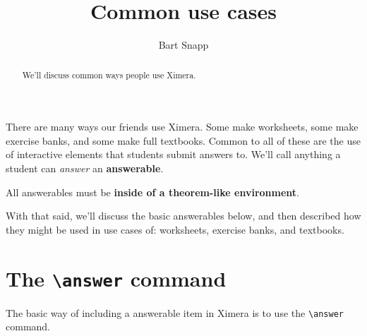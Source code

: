 \documentclass{ximera}
\title{Common use cases}
\author{Bart Snapp}
\begin{document}
\begin{abstract}
  We'll discuss common ways people use Ximera.
\end{abstract}
\maketitle

There are many ways our friends use Ximera. Some make worksheets, some make
exercise banks, and some make full textbooks. Common to all of these are the
use of interactive elements that students submit answers to. We'll call
anything a student can \textit{answer} an \textbf{answerable}.

\begin{warning}
  All answerables must be \textbf{inside of a theorem-like environment}.
\end{warning}

With that said, we'll discuss the basic answerables below, and then described
how they might be used in use cases of: worksheets, exercise banks, and
textbooks.

\section{The \texttt{\textbackslash answer} command}

The basic way of including a answerable item in Ximera is to use the
\verb|\answer| command.
\end{document}
